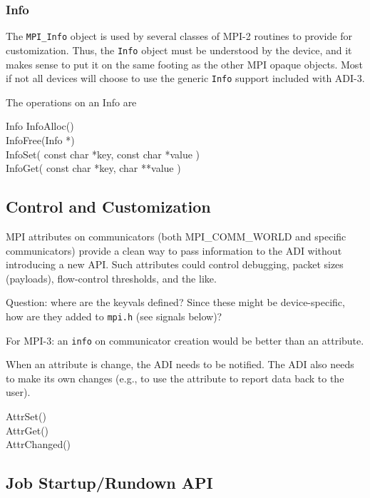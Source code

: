 \documentclass{article}
\let\file=\texttt
\let\code=\texttt
\begin{document}
\subsubsection{Info}
The \code{MPI\_Info} object is used by several classes of MPI-2 routines to
provide for customization.  Thus, the \code{Info} object must be understood by
the device, and it makes sense to put it on the same footing as the other MPI
opaque objects.  Most if not all devices will choose to use the generic
\code{Info} support included with ADI-3.

The operations on an Info are
\begin{description}
\item[Info InfoAlloc()]
\item[InfoFree(Info *)]
\item[InfoSet( const char *key, const char *value )]
\item[InfoGet( const char *key, char **value )]
\end{description}

\subsection{Control and Customization}
MPI attributes on communicators (both MPI\_COMM\_WORLD and specific
communicators) provide a clean way to pass information to the ADI without
introducing a new API.  Such attributes could control debugging, packet sizes
(payloads), flow-control thresholds, and the like.

Question: where are the keyvals defined?  Since these might be
device-specific, how are they added to \file{mpi.h} (see signals below)?  

For MPI-3: an \code{info} on communicator creation would be better than an
attribute. 

When an attribute is change, the ADI needs to be notified.  The ADI also needs
to make its own changes (e.g., to use the attribute to report data back to the
user).

\begin{description}
\item[AttrSet()]
\item[AttrGet()]
\item[AttrChanged()]
\end{description}

\subsection{Job Startup/Rundown API}
\end{document}
